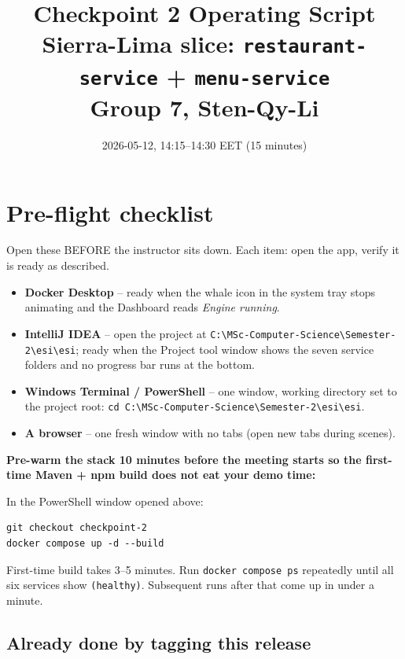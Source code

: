 \documentclass[11pt]{article}
\title{Checkpoint 2 Operating Script\\
  \large Sierra-Lima slice: \texttt{restaurant-service} + \texttt{menu-service}\\
  \large Group 7, Sten-Qy-Li}
\date{2026-05-12, 14:15--14:30 EET (15 minutes)}
\author{}
\begin{document}
\maketitle

\section{Pre-flight checklist}

Open these BEFORE the instructor sits down. Each item: open the app, verify it is ready as described.

\begin{itemize}[leftmargin=*]
  \item \textbf{Docker Desktop} -- ready when the whale icon in the system tray stops animating and the Dashboard reads \emph{Engine running}.
  \item \textbf{IntelliJ IDEA} -- open the project at \texttt{C:\textbackslash MSc-Computer-Science\textbackslash Semester-2\textbackslash esi\textbackslash esi}; ready when the Project tool window shows the seven service folders and no progress bar runs at the bottom.
  \item \textbf{Windows Terminal / PowerShell} -- one window, working directory set to the project root: \texttt{cd C:\textbackslash MSc-Computer-Science\textbackslash Semester-2\textbackslash esi\textbackslash esi}.
  \item \textbf{A browser} -- one fresh window with no tabs (open new tabs during scenes).
\end{itemize}

\textbf{Pre-warm the stack 10 minutes before the meeting starts so the first-time Maven + npm build does not eat your demo time:}

\begin{dobox}
In the PowerShell window opened above:
\begin{lstlisting}
git checkout checkpoint-2
docker compose up -d --build
\end{lstlisting}
\end{dobox}

\begin{seebox}
First-time build takes 3--5 minutes. Run \texttt{docker compose ps} repeatedly until all six services show \texttt{(healthy)}. Subsequent runs after that come up in under a minute.
\end{seebox}

\subsection*{Already done by tagging this release}
\end{document}
